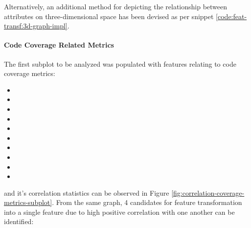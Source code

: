 Alternatively, an additional method for depicting the relationship between attributes on three-dimensional space has been devised as per snippet \ref{code:feat-transf:3d-graph-impl}.

\FloatBarrier

\paragraph{Code Coverage Related Metrics}\label{sec:impl-data-analysis:corr:code-coverage}
The first subplot to be analyzed was populated with features relating to code coverage metrics:
\begin{itemize}\label{lst:code-coverage-candidates}
    \item \branchCoverage{}
    \item \overallBranchCoverage{}
    \item \overallCoverage{}
    \item \overallLineCoverage{}
    \item \overallUncoveredConditions{}
    \item \overallUncoveredLines{}
    \item \coverage{}
    \item \lineCoverage{}
    \item \uncoveredConditions{}
    \item \uncoveredLines{}
\end{itemize}
and it's correlation statistics can be observed in Figure \ref{fig:correlation-coverage-metrics-subplot}. From the same graph, 4 candidates for feature transformation into a single feature due to high positive correlation with one another can be identified:
